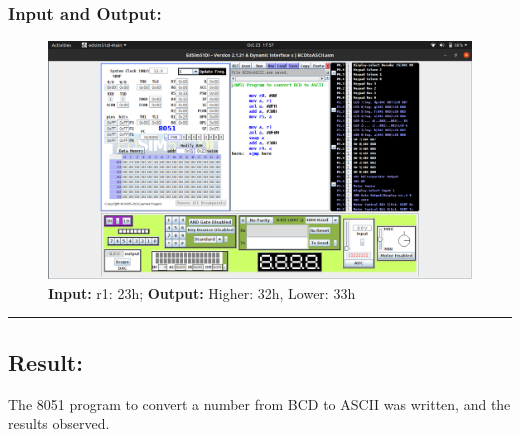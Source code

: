 \documentclass[12pt,a4paper]{article}
\begin{document}
\begin{flushleft}
\subsubsection*{\textbf{Input and Output:}}
\begin{figure}[h]
    \centering
    \includegraphics[trim = 60mm 75mm 60mm 10mm, clip, width = \textwidth]{Pics/BCDtoASCII.png}
    \caption{ \textbf{Input:} r1: 23h; 
              \textbf{Output:} Higher: 32h, Lower: 33h}
\end{figure}
\hrule
\subsection*{\textbf{Result:}}
The 8051 program to convert a number from BCD to ASCII was written, and the results observed.
\end{flushleft}
\end{document}
